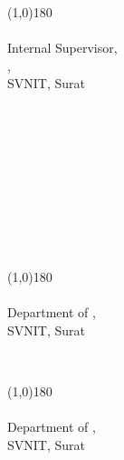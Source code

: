 \normalsize
\onehalfspacing
\vspace{75pt}
\begin{minipage}{0.4\textwidth}
    \begin{center}
        \line(1,0){180}\\
        {\InternalSupervisor{}\\
        Internal Supervisor,\\
        \InternalSupervisorDept{},\\
        SVNIT, Surat
        }    
    \end{center}   
\end{minipage}\begin{minipage}{0.19\textwidth}
    ~
\end{minipage}\begin{minipage}{0.4\textwidth}
    \begin{center}
       ~\\~\\~\\~\\~
    \end{center}
\end{minipage}
\vspace{75pt}\\
\begin{minipage}{0.4\textwidth}
    \begin{center}
        \line(1,0){180}\\
        {\ExaminerOne{}\\
        Department of \Subject{}, \\
        SVNIT, Surat}
    \end{center}     
\end{minipage}\begin{minipage}{0.19\textwidth}
    ~
\end{minipage}\begin{minipage}{0.4\textwidth}
    \begin{center}
        \line(1,0){180}\\
        {\ExaminerTwo{}\\
        Department of \Subject{},\\
        SVNIT, Surat}
    \end{center}   
\end{minipage}
\vspace{10pt}\\

